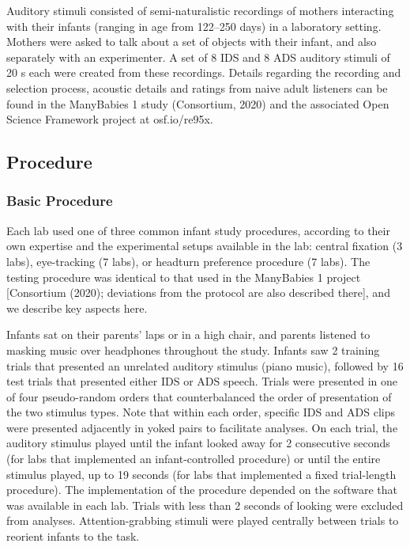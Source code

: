 \documentclass[,man,floatsintext]{apa6}
\begin{document}
Auditory stimuli consisted of semi-naturalistic recordings of mothers interacting with their infants (ranging in age from 122--250 days) in a laboratory setting. Mothers were asked to talk about a set of objects with their infant, and also separately with an experimenter. A set of 8 IDS and 8 ADS auditory stimuli of 20 s each were created from these recordings. Details regarding the recording and selection process, acoustic details and ratings from naive adult listeners can be found in the ManyBabies 1 study (Consortium, 2020) and the associated Open Science Framework project at osf.io/re95x.

\hypertarget{procedure}{%
\subsection{Procedure}\label{procedure}}

\hypertarget{basic-procedure}{%
\subsubsection{Basic Procedure}\label{basic-procedure}}

Each lab used one of three common infant study procedures, according to their own expertise and the experimental setups available in the lab: central fixation (3 labs), eye-tracking (7 labs), or headturn preference procedure (7 labs). The testing procedure was identical to that used in the ManyBabies 1 project {[}Consortium (2020); deviations from the protocol are also described there{]}, and we describe key aspects here.

Infants sat on their parents' laps or in a high chair, and parents listened to masking music over headphones throughout the study. Infants saw 2 training trials that presented an unrelated auditory stimulus (piano music), followed by 16 test trials that presented either IDS or ADS speech. Trials were presented in one of four pseudo-random orders that counterbalanced the order of presentation of the two stimulus types. Note that within each order, specific IDS and ADS clips were presented adjacently in yoked pairs to facilitate analyses. On each trial, the auditory stimulus played until the infant looked away for 2 consecutive seconds (for labs that implemented an infant-controlled procedure) or until the entire stimulus played, up to 19 seconds (for labs that implemented a fixed trial-length procedure). The implementation of the procedure depended on the software that was available in each lab. Trials with less than 2 seconds of looking were excluded from analyses. Attention-grabbing stimuli were played centrally between trials to reorient infants to the task.
\end{document}
